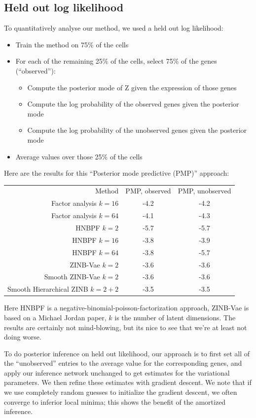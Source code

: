\subsection{Held out log likelihood}

To quantitatively analyse our method, we used a held out log likelihood:

\begin{itemize}
\item Train the method on 75\% of the cells
\item For each of the remaining 25\% of the cells, select 75\% of the genes (``observed''):
  \begin{itemize}
  \item Compute the posterior mode of Z given the expression of those genes
  \item Compute the log probability of the observed genes given the posterior mode
  \item Compute the log probability of the unobserved genes given the posterior mode
  \end{itemize}
\item Average values over those 25\% of the cells
\end{itemize}

Here are the results for this ``Posterior mode predictive (PMP)'' approach:

\begin{tabular}{r|cc}
Method & PMP, observed & PMP, unobserved \\
Factor analysis $k=16$ & -4.2 & -4.2 \\
Factor analysis $k=64$ & -4.1 & -4.3 \\
HNBPF $k=2$ & -5.7 & -5.7 \\
HNBPF $k=16$ & -3.8 & -3.9 \\
HNBPF $k=64$ & -3.8 & -5.7 \\
ZINB-Vae $k=2$ & -3.6 & -3.6 \\
Smooth ZINB-Vae $k=2$ & -3.6 & -3.6 \\
Smooth Hierarchical ZINB $k=2+2$ & -3.5 & -3.5 \\
\hline
\end{tabular}

Here HNBPF is a negative-binomial-poisson-factorization approach, ZINB-Vae is based on a Michael Jordan paper, $k$ is the number of latent dimensions.  The results are certainly not mind-blowing, but its nice to see that we're at least not doing worse.  

To do posterior inference on held out likelihood, our approach is to first set all of the ``unobserved'' entries to the average value for the corresponding genes, and apply our inference network unchanged to get estimates for the variational parameters.  We then refine these estimates with gradient descent.  We note that if we use completely random guesses to initialize the gradient descent, we often converge to inferior local minima; this shows the benefit of the amortized inference.  

